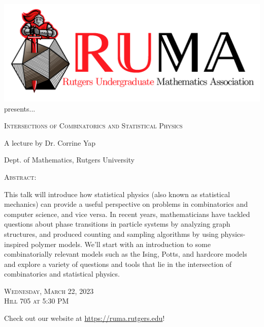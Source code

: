 \documentclass[12pt]{article}
\begin{document}

\begin{center}\includegraphics[scale=.3]{RUMAlogo.png}\\
\large  presents... \\

\vspace{1mm}
\begin{spacing}{1.5}
{\fontsize{28}{18}\selectfont  \textsc{
    Intersections of Combinatorics and Statistical Physics 
    }} \end{spacing}
 
\begin{spacing}{1.1}
{\fontsize{20}{18} \selectfont A lecture by Dr. Corrine Yap} 
\end{spacing} 
\large Dept. of Mathematics, Rutgers University

\normalsize

\vspace{5mm}

\textsc{Abstract:}



\Large
This talk will introduce how statistical physics (also known as statistical mechanics) can provide a useful perspective on problems in combinatorics and computer science, and vice versa. In recent years, mathematicians have tackled questions about phase transitions in particle systems by analyzing graph structures, and produced counting and sampling algorithms by using physics-inspired polymer models. We'll start with an introduction to some combinatorially relevant models such as the Ising, Potts, and hardcore models and explore a variety of questions and tools that lie in the intersection of combinatorics and statistical physics.




\begin{spacing}{1.5}
    {\fontsize{24}{28}\selectfont  \textsc{
        Wednesday, March 22, 2023 \\ Hill 705 at 5:30 PM}
    } 
\end{spacing}

\Large  Check out our website at 
\url{https://ruma.rutgers.edu}!
\end{center}
\end{document}
